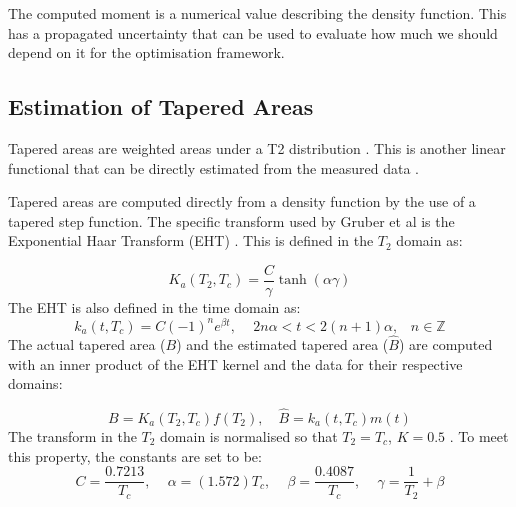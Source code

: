 The computed moment is a numerical value describing the density function. This has a propagated uncertainty that can be used to evaluate how much we should depend on it for the optimisation framework.


\subsection{Estimation of Tapered Areas}
Tapered areas are weighted areas under a T2 distribution \cite{TaperedAreaskleinberg1997tapered}. This is another linear functional that can be directly estimated from the measured data \cite{GruberLinearFunctionals2013}.

Tapered areas are computed directly from a density function by the use of a tapered step function. The specific transform used by Gruber et al is the Exponential Haar Transform (EHT) \cite{GruberLinearFunctionals2013}. This is defined in the $T_2$ domain as:

\begin{equation}
    K_a(T_2, T_c) = \frac{C}{\gamma}\tanh(\alpha \gamma) 
    \label{eq:expHaarTransformT2}
\end{equation}
The EHT is also defined in the time domain as:
\begin{equation}
    k_a(t, T_c) = C(-1)^n e^{\beta t} \text{, } \quad 2n\alpha < t < 2(n+1)\alpha \text{,}   \quad n \in \mathbb{Z}
    \label{eq:expHaarTransformTime}
\end{equation}
The actual tapered area ($B$) and the estimated tapered area ($\hat{B}$) are computed with an inner product of the EHT kernel and the data for their respective domains:

\begin{equation}
   \label{eq:estTaperedAreas}
   B = K_a(T_2,T_c)f(T_2),  \quad \hat{B} = k_a(t, T_c)m(t)
\end{equation}
The transform in the $T_2$ domain is normalised so that $T_2 = T_c$, $K = 0.5$ \cite{GruberLinearFunctionals2013}. To meet this property, the constants are set to be:
\begin{equation}
    C = \frac{0.7213}{T_c} \text{, } \quad \alpha = (1.572)T_c \text{, } \quad
   \beta = \frac{0.4087}{T_c}  \text{, } \quad \gamma = \frac{1}{T_2} + \beta  
   \label{eq:haarTransformConstants}
\end{equation}



